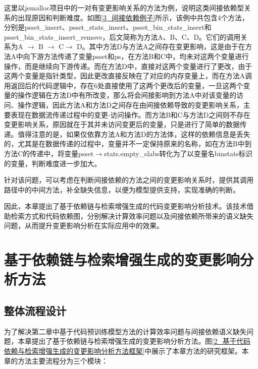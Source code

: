 这里以jemalloc项目中的一对有变更影响关系的方法为例，说明这类间接依赖型关系的出现原因和判断难度。如图\ref{3_间接依赖例子}所示，该例中共包含4个方法，分别是psset\_insert、psset\_stats\_insert、psset\_bin\_stats\_insert和psset\_bin\_stats\_insert\_remove，后文简称为方法A、B、C、D。它们的调用关系为A $\rightarrow$ B $\rightarrow$ C$\rightarrow$ D。其中方法D与方法A之间存在变更影响，这是由于在方法A中向下游方法传递了变量psset和ps，在方法B和C中，均未对这两个变量进行操作，而是继续向下游传递。而在方法D中，直接对这两个变量进行了更改，由于这两个变量是指针类型，因此更改直接反映在了对应的内存变量上，而在方法A调用返回后的代码逻辑中，存在6处直接使用了这两个更改后的变量，一旦这两个变量的操作逻辑在方法D中有所改变，那么将会间接影响到方法A中对该变量的访问、操作逻辑，因此方法A和方法D之间存在由间接依赖导致的变更影响关系，主要表现在数据流传递过程中的变更-访问操作。而方法B和C与方法D之间则不存在变更影响关系，原因就在于其并未访问变更后的变量，只是进行了简单的数据传递。值得注意的是，如果仅依靠方法A和方法D的方法体，这样的依赖信息是丢失的，尤其是在数据传递的过程中，变量并不一定保持原来的名称，如在方法B中到方法C的传递中，将变量psset$\rightarrow$stats.empty\_slabs转化为了以变量名binstats标识的变量，判断难度进一步加大。




针对该问题，可以考虑在判断间接依赖的方法之间的变更影响关系时，提供其调用路径中的中间方法，补全缺失信息，以便为模型提供支持，实现准确的判断。

因此，本章提出了基于依赖链与检索增强生成的代码变更影响分析技术。该技术借助检索方式和代码依赖图，分别解决计算效率问题以及间接依赖所带来的语义缺失问题，从而提升变更影响分析在实际应用中的效果。


\section{基于依赖链与检索增强生成的变更影响分析方法}


\subsection{整体流程设计}

为了解决第二章中基于代码预训练模型方法的计算效率问题与间接依赖语义缺失问题，本章提出了基于依赖链与检索增强生成的变更影响分析方法。图\ref{2_基于代码依赖与检索增强生成的变更影响分析方法框架}中展示了本章方法的研究框架。本章的方法主要流程分为三个模块：

